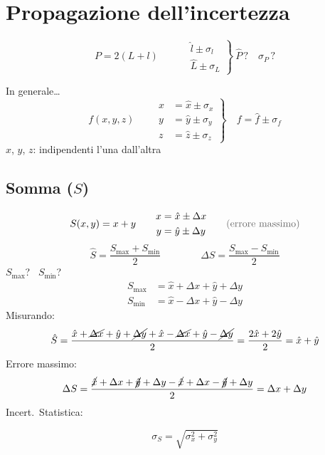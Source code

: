 \documentclass[11pt,a4paper,oneside]{book}
\newcommand{\grigio}[1]{{\color{grigio}#1}}
\begin{document}
\section{Propagazione dell'incertezza}

\begin{minipage}[c]{0.3\linewidth}
\centering
{}
\end{minipage}\hfill
\begin{minipage}[c]{0.65\linewidth}
\[
  P = 2(L + l) \qquad
  \left.
  \begin{aligned}
    &\hat{l} \pm \sigma_l \\
    &\hat{L} \pm \sigma_L
  \end{aligned}
  \right\}
  \ \hat{P}\,? \quad \sigma_P\,?
\]
\end{minipage}

In generale\ldots
\[
  f(x, y, z) \qquad
  \left.
  \begin{aligned}
    x &= \hat{x} \pm \sigma_x \\
    y &= \hat{y} \pm \sigma_y \\
    z &= \hat{z} \pm \sigma_z
  \end{aligned}
  \right\}
  \quad f = \hat{f} \pm \sigma_f
\]
$x$, $y$, $z$: indipendenti l'una dall'altra

\subsection*{Somma ($S$)}
\[
  S(x, y) = x + y \qquad
  \begin{aligned}
    x &= \hat{x} \pm \Delta x \\
    y &= \hat{y} \pm \Delta y
  \end{aligned}
  \qquad \text{\grigio{(errore massimo)}}
\]
\[
  \hat{S} = \frac{S_{\max} + S_{\min}}{2} \qquad\qquad \Delta S = \frac{S_{\max} - S_{\min}}{2}
\]
$S_{\max}$? \ $S_{\min}$?
\[
  \begin{aligned}
    S_{\max} &= \hat{x} + \Delta x + \hat{y} + \Delta y \\
    S_{\min} &= \hat{x} - \Delta x + \hat{y} - \Delta y
  \end{aligned}
\]
\grigio{Misurando:}
\[
  \hat{S} = \frac{\hat{x} + \cancel{\Delta x} + \hat{y} + \cancel{\Delta y} + \hat{x} - \cancel{\Delta x} + \hat{y} - \cancel{\Delta y}}{2} = \frac{2\hat{x} + 2\hat{y}}{2} = \hat{x} + \hat{y}
\]
\grigio{Errore massimo:}
\[
  \Delta S = \frac{\cancel{\hat{x}} + \Delta x + \cancel{\hat{y}} + \Delta y - \cancel{\hat{x}} + \Delta x - \cancel{\hat{y}} + \Delta y}{2} = \Delta x + \Delta y
\]
Incert.\ Statistica:
\begin{formulabox}
\[
  \sigma_S = \sqrt{\sigma_x^2 + \sigma_y^2}
\]
\end{formulabox}
\end{document}
